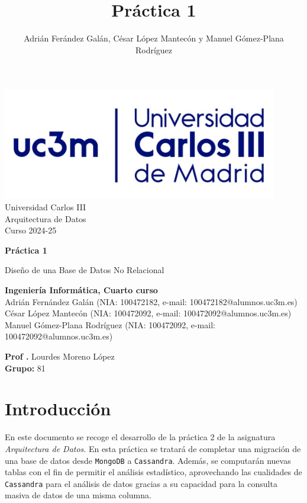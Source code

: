 \documentclass[]{article}
\title{Práctica 1}
\author{Adrián Ferández Galán, César López Mantecón y Manuel Gómez-Plana Rodríguez}
\begin{document}
\begin{titlepage}
    \centering
   \includegraphics[width=0.9\textwidth]{uc3m.jpg} 
    {\Huge Universidad Carlos III\\
    
     \Large Arquitectura de Datos\\
     \vspace{0.5cm}
     Curso 2024-25}
    \vspace{2cm}

    {\Huge \textbf{Práctica 1} \par}
    \vspace{0.5cm}
    {\Large Diseño de una Base de Datos No Relacional \par}
    \vspace{8cm}

   \textbf{Ingeniería Informática, Cuarto curso}\\
    \vspace{0.2cm} 
    Adrián Fernández Galán       (NIA: 100472182, e-mail: 100472182@alumnos.uc3m.es)\\
    César López Mantecón         (NIA: 100472092, e-mail: 100472092@alumnos.uc3m.es)\\
    Manuel Gómez-Plana Rodríguez (NIA: 100472092, e-mail: 100472092@alumnos.uc3m.es)
    \vspace{0.5cm}

   
    \textbf{Prof .} Lourdes Moreno López\\
    
    \textbf{Grupo: } 81   
    
\end{titlepage}
\newpage

\renewcommand{\contentsname}{\centering Índice}
\tableofcontents

\newpage

\section{Introducción}
\label{sec:introduccion}
En este documento se recoge el desarrollo de la práctica 2 de la asignatura
\textit{Arquitectura de Datos}. En esta práctica se tratará de completar una
migración de una base de datos desde \texttt{MongoDB} a \texttt{Cassandra}.
Además, se computarán nuevas tablas con el fin de permitir el análisis
estadístico, aprovechando las cualidades de \texttt{Cassandra} para el análisis
de datos gracias a su capacidad para la consulta masiva de datos de una misma
columna.
\end{document}
